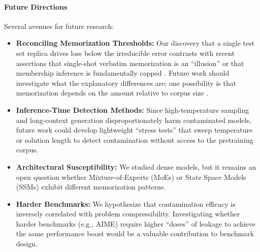 \paragraph{Future Directions}
Several avenues for future research:
%
\begin{itemize}
    \item \textbf{Reconciling Memorization Thresholds:} Our discovery that a single test set replica drives loss below the irreducible error contrasts with recent assertions that single-shot verbatim memorization is an ``illusion'' \citep{huang2024demystifying} or that membership inference is fundamentally capped \citep{hayes2025exploring}. Future work should investigate what the explanatory differences are; one possibility is that memorization depends on the amount relative to corpus size \citep{schaeffer2025doseresponse, wei2025hubblemodelsuiteadvance}.
    \item \textbf{Inference-Time Detection Methods:} Since high-temperature sampling and long-context generation disproportionately harm contaminated models, future work could develop lightweight ``stress tests'' that sweep temperature or solution length to detect contamination without access to the pretraining corpus.
    \item \textbf{Architectural Susceptibility:} We studied dense models, but it remains an open question whether Mixture-of-Experts (MoEs) or State Space Models (SSMs) exhibit different memorization patterns.
    \item \textbf{Harder Benchmarks:} We hypothesize that contamination efficacy is inversely correlated with problem compressibility. Investigating whether harder benchmarks (e.g., AIME) require higher ``doses'' of leakage to achieve the same performance boost would be a valuable contribution to benchmark design.
\end{itemize}
